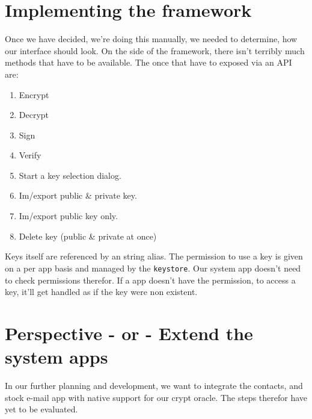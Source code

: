 \documentclass[a4paper]{scrartcl}
\begin{document}
\section{Implementing the framework}
	Once we have decided, we're doing this manually, we needed to determine, how our interface should look. On the side of the framework, there isn't terribly much methods that have to be available. The once that have to exposed via an API are:
	\begin{enumerate} %
		\item Encrypt
		\item Decrypt
		\item Sign
		\item Verify
		\item Start a key selection dialog.
		\item Im/export public \& private key.
		\item Im/export public key only.
		\item Delete key (public \& private at once)
	\end{enumerate}
	Keys itself are referenced by an string alias. The permission to use a key is given on a per app basis and managed by the \texttt{keystore}. Our system app doesn't need to check permissions therefor. If a app doesn't have the permission, to access a key, it'll get handled as if the key were non existent.

\section{Perspective - or - Extend the system apps}
In our further planning and development, we want to integrate the contacts, and stock e-mail app with native support for our crypt oracle. The steps therefor have yet to be evaluated.
\end{document}
